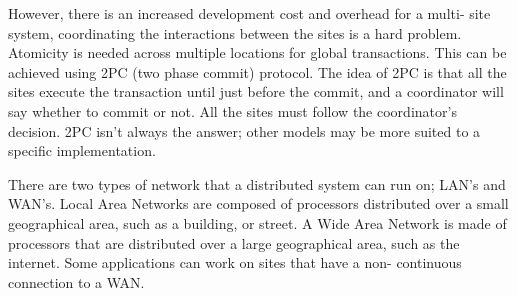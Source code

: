 \begin{description}
    However, there is an increased development cost and overhead for a multi-
    site system, coordinating the interactions between the sites is a hard
    problem. Atomicity is needed across multiple locations for global
    transactions. This can be achieved using 2PC (two phase commit) protocol.
    The idea of 2PC is that all the sites execute the transaction until just
    before the commit, and a coordinator will say whether to commit or not. All
    the sites must follow the coordinator's decision. 2PC isn't always the
    answer; other models may be more suited to a specific implementation.

    There are two types of network that a distributed system can run on; LAN's
    and WAN's. Local Area Networks are composed of processors distributed over a
    small geographical area, such as a building, or street. A Wide Area Network
    is made of processors that are distributed over a large geographical area,
    such as the internet. Some applications can work on sites that have a non-
    continuous connection to a WAN.

\end{description}

